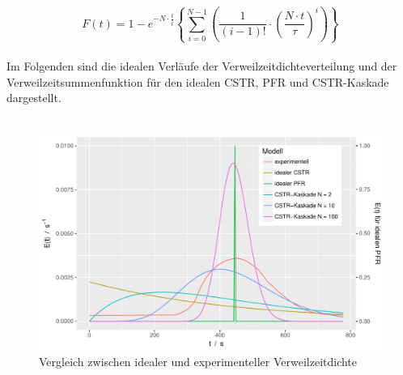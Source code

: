 \documentclass[12pt,liststotoc]{report}
\begin{document}
\begin{equation}
F(t) = 1 - e^{- N \cdot \frac{t}{\bar{t}}} \left\{ \sum_{i=0}^{N-1} \left(\frac{1}{(i-1)!} \cdot \left(\frac{N \cdot t}{\tau} \right)^i \right) \right\}
\end{equation}
\noindent
\\
Im Folgenden sind die idealen Verläufe der Verweilzeitdichteverteilung und der Verweilzeitsummenfunktion für den idealen CSTR, PFR und CSTR-Kaskade dargestellt.
\\
\\
\begin{figure}[H]
\centering
\includegraphics[width=1\textwidth]{Graphics/E_vergleich.pdf}
\caption[Vergleich Verweilzeitdichten]{Vergleich zwischen idealer und experimenteller Verweilzeitdichte}
\label{dichte_vergleich}
\end{figure}
\noindent
\end{document}

